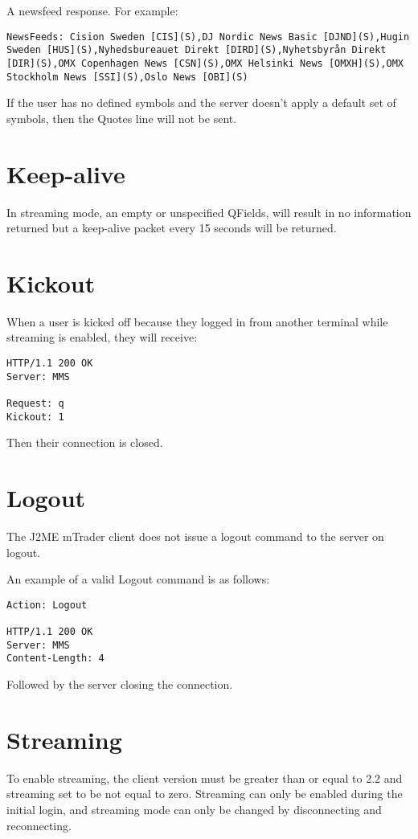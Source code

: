 \documentclass[12pt,twoside,letterpaper]{report}
\begin{document}
A newsfeed response. For example:
\begin{lstlisting}
NewsFeeds: Cision Sweden [CIS](S),DJ Nordic News Basic [DJND](S),Hugin Sweden [HUS](S),Nyhedsbureauet Direkt [DIRD](S),Nyhetsbyrån Direkt [DIR](S),OMX Copenhagen News [CSN](S),OMX Helsinki News [OMXH](S),OMX Stockholm News [SSI](S),Oslo News [OBI](S)
\end{lstlisting}

If the user has no defined symbols and the server doesn't apply a default set of symbols, then the Quotes line will not be sent.

\section*{Keep-alive}
In streaming mode, an empty or unspecified QFields, will result in no information returned but a keep-alive packet every 15 seconds will be returned.

\section*{Kickout}
When a user is kicked off because they logged in from another terminal while streaming is enabled, they will receive:

\begin{verbatim}
HTTP/1.1 200 OK
Server: MMS

Request: q
Kickout: 1
\end{verbatim}

Then their connection is closed.

\section*{Logout}
The J2ME mTrader client does not issue a logout command to the server on logout.

An example of a valid Logout command is as follows:
\begin{verbatim}
Action: Logout

HTTP/1.1 200 OK
Server: MMS
Content-Length: 4
\end{verbatim}
Followed by the server closing the connection.

\section*{Streaming}
To enable streaming, the client version must be greater than or equal to 2.2 and streaming set to be not equal to zero. Streaming can only be enabled during the initial login, and streaming mode can only be changed by disconnecting and reconnecting.
\end{document}
